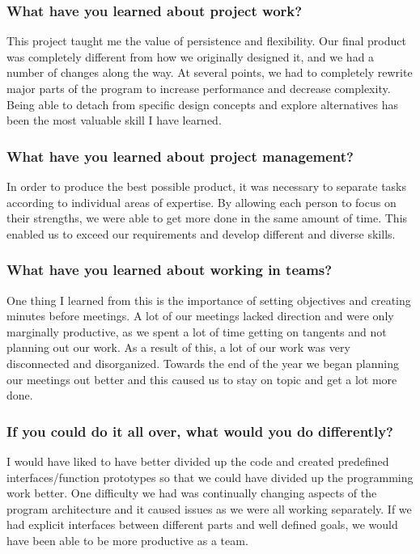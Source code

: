 \subsubsection{What have you learned about project work?}
This project taught me the value of persistence and flexibility. Our final product was completely different from how we originally designed it, and we had a number of changes along the way. At several points, we had to completely rewrite major parts of the program to increase performance and decrease complexity. Being able to detach from specific design concepts and explore alternatives has been the most valuable skill I have learned.\\

\subsubsection{What have you learned about project management?}
In order to produce the best possible product, it was necessary to separate tasks according to individual areas of expertise. By allowing each person to focus on their strengths, we were able to get more done in the same amount of time. This enabled us to exceed our requirements and develop different and diverse skills.\\

\subsubsection{What have you learned about working in teams?}
One thing I learned from this is the importance of setting objectives and creating minutes before meetings. A lot of our meetings lacked direction and were only marginally productive, as we spent a lot of time getting on tangents and not planning out our work. As a result of this, a lot of our work was very disconnected and disorganized. Towards the end of the year we began planning our meetings out better and this caused us to stay on topic and get a lot more done.\\

\subsubsection{If you could do it all over, what would you do differently?}
I would have liked to have better divided up the code and created predefined interfaces/function prototypes so that we could have divided up the programming work better. One difficulty we had was continually changing aspects of the program architecture and it caused issues as we were all working separately. If we had explicit interfaces between different parts and well defined goals, we would have been able to be more productive as a team.